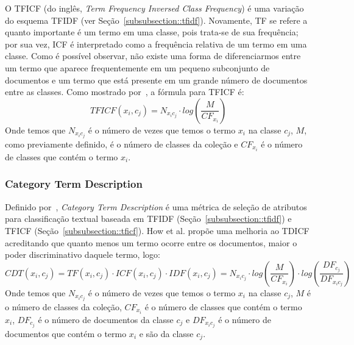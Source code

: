 O TFICF (do inglês, \textit{Term Frequency Inversed Class Frequency}) é uma variação do esquema TFIDF (ver Seção~\ref{subsubsection::tfidf}). Novamente, TF se refere a quanto importante é um termo em uma classe, pois trata-se de sua frequência; por sua vez, ICF é interpretado como a frequência relativa de um termo em uma classe. Como é possível observar, não existe uma forma de diferenciarmos entre um termo que aparece frequentemente em um pequeno subconjunto de documentos e um termo que está presente em um grande número de documentos entre as classes. Como mostrado por~\cite{ChihHow04}, a fórmula para TFICF é:
\begin{equation}\label{eqn::tficf}
   TFICF(x_i, c_j) = N_{x_ic_j} \cdot log( \frac{M}{CF_{x_i}} )
\end{equation}
Onde temos que $N_{x_ic_j}$ é o número de vezes que temos o termo $x_i$ na classe $c_j$, $M$, como previamente definido, é o número de classes da coleção e $CF_{x_i}$ é o número de classes que contém o termo $x_i$. 

\subsubsection{Category Term Description}
\label{subsubsection::ctd}

Definido por~\cite{ChihHow04}, \textit{Category Term Description} é uma métrica de seleção de atributos para classificação textual baseada em TFIDF (Seção~\ref{subsubsection::tfidf}) e TFICF (Seção~\ref{subsubsection::tficf}). How et al. propõe uma melhoria ao TDICF acreditando que quanto menos um termo ocorre entre os documentos, maior o poder discriminativo daquele termo, logo:
\begin{equation}\label{eqn::cdt}
   CDT(x_i, c_j) = TF(x_i, c_j) \cdot ICF(x_i, c_j) \cdot IDF(x_i,c_j) =  N_{x_ic_j} \cdot log( \frac{M}{CF_{x_i}} ) \cdot  log( \frac{DF_{c_j}}{ DF_{x_ic_j} } )
\end{equation}
Onde temos que $N_{x_ic_j}$ é o número de vezes que temos o termo $x_i$ na classe $c_j$, $M$ é o número de classes da coleção, $CF_{x_i}$ é o número de classes que contém o termo $x_i$, $DF_{c_j}$ é o número de documentos da classe $c_j$ e $DF_{x_ic_j}$ é o número de documentos que contém o termo $x_i$ e são da classe $c_j$.

